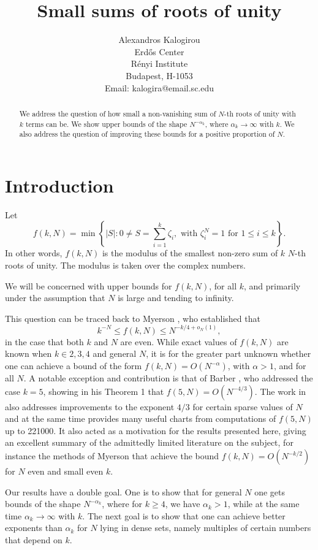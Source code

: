 \documentclass[12pt]{article}
\title{Small sums of roots of unity}
\author{
Alexandros Kalogirou \\
Erd\H{o}s Center \\
R\'enyi Institute \\
Budapest, H-1053 \\
Email: kalogira@email.sc.edu}
\theoremstyle{definition}
\begin{document}
\maketitle
\begin{abstract}
    We address the question of how small a non-vanishing sum of $N$-th roots of unity with $k$ terms can be. We show upper bounds of the shape $N^{-\alpha_k}$, where $\alpha_k\rightarrow\infty$ with $k$. We also address the question of improving these bounds for a positive proportion of $N$. 
\end{abstract}
\section{Introduction}
Let 
\begin{equation}\label{def}
    f(k,N)=\min\left\{|S|: 0\neq S=\sum_{i=1}^k \zeta_i, \text{ with  }\zeta_i^N=1 \text{ for }1\leq i\leq k \right\}.
\end{equation}
In other words, $f(k,N)$ is the modulus of the smallest non-zero sum of $k$ $N$-th roots of unity. The modulus is taken over the complex numbers.

We will be concerned with upper bounds for $f(k,N)$, for all $k$, and primarily under the assumption that $N$ is large and tending to infinity. 

This question can be traced back to Myerson \cite{myerson}, who established that 
\begin{equation}
    k^{-N}\leq f(k,N)\leq N^{-k/4+o_N(1)},
\end{equation}
in the case that both $k$ and $N$ are even. While exact values of $f(k,N)$ are known when $k\in{2,3,4}$ and general $N$, it is for the greater part unknown whether one can achieve a bound of the form $f(k,N)=O(N^{-\alpha})$, with $\alpha>1$, and for all $N$. A notable exception and contribution is that of Barber \cite{benb}, who addressed the case $k=5$, showing in his Theorem 1 that $f(5,N)=O(N^{-4/3})$. The work in \cite{benb} also addresses improvements to the exponent $4/3$ for certain sparse values of $N$ and at the same time provides many useful charts from computations of $f(5,N)$ up to 221000. It also acted as a motivation for the results presented here, giving an excellent summary of the admittedly limited literature on the subject, for instance the methods of Myerson that achieve the bound $f(k,N)=O(N^{-k/2})$ for $N$ even and small even $k$.

Our results have a double goal. One is to show that for general $N$ one gets bounds of the shape $N^{-\alpha_k}$, where for $k\geq 4$, we have $\alpha_k>1$, while at the same time $\alpha_k\rightarrow \infty$ with $k$. The next goal is to show that one can achieve better exponents than $\alpha_k$ for $N$ lying in dense sets, namely multiples of certain numbers that depend on $k$.
\end{document}
